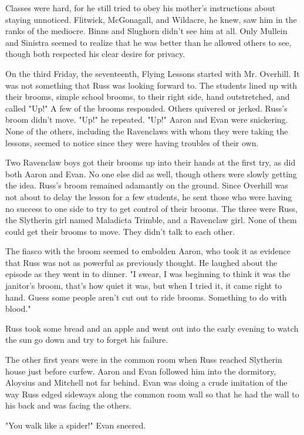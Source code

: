 \documentclass[a4paper,11pt]{article}
\begin{document}
Classes were hard, for he still tried to obey his mother's instructions about staying unnoticed. Flitwick, McGonagall, and Wildacre, he knew, saw him in the ranks of the mediocre. Binns and Slughorn didn't see him at all. Only Mullein and Sinistra seemed to realize that he was better than he allowed others to see, though both respected his clear desire for privacy.

On the third Friday, the seventeenth, Flying Lessons started with Mr. Overhill. It was not something that Russ was looking forward to. The students lined up with their brooms, simple school brooms, to their right side, hand outstretched, and called "Up!" A few of the brooms responded. Others quivered or jerked. Russ's broom didn't move. "Up!" he repeated. "Up!" Aaron and Evan were snickering. None of the others, including the Ravenclaws with whom they were taking the lessons, seemed to notice since they were having troubles of their own.

Two Ravenclaw boys got their brooms up into their hands at the first try, as did both Aaron and Evan. No one else did as well, though others were slowly getting the idea. Russ's broom remained adamantly on the ground. Since Overhill was not about to delay the lesson for a few students, he sent those who were having no success to one side to try to get control of their brooms. The three were Russ, the Slytherin girl named Maladicta Trimble, and a Ravenclaw girl. None of them could get their brooms to move. They didn't talk to each other.

The fiasco with the broom seemed to embolden Aaron, who took it as evidence that Russ was not as powerful as previously thought. He laughed about the episode as they went in to dinner. "I swear, I was beginning to think it was the janitor's broom, that's how quiet it was, but when I tried it, it came right to hand. Guess some people aren't cut out to ride brooms. Something to do with blood."

Russ took some bread and an apple and went out into the early evening to watch the sun go down and try to forget his failure.

The other first years were in the common room when Russ reached Slytherin house just before curfew. Aaron and Evan followed him into the dormitory, Aloysius and Mitchell not far behind. Evan was doing a crude imitation of the way Russ edged sideways along the common room wall so that he had the wall to his back and was facing the others.

"You walk like a spider!" Evan sneered.
\end{document}
